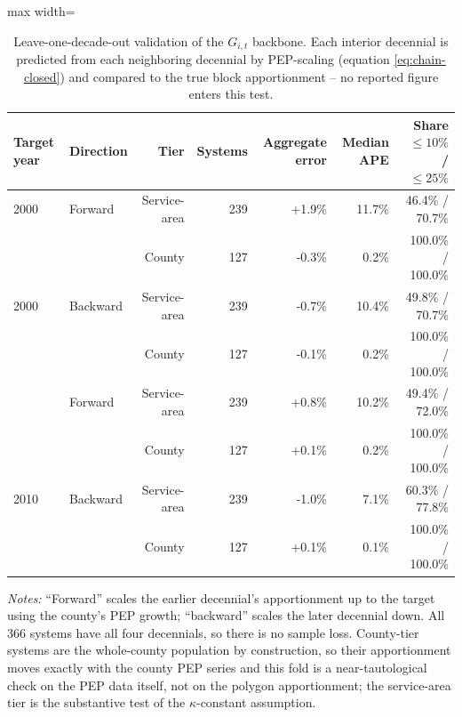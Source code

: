 \begin{table}[ht]
\centering
\caption{Leave-one-decade-out validation of the $G_{i,t}$ backbone. Each interior decennial is predicted from each neighboring decennial by PEP-scaling (equation \ref{eq:chain-closed}) and compared to the true block apportionment -- no reported figure enters this test.}
\label{tab:backcast_lodo}
\begin{adjustbox}{max width=\textwidth}
\begin{tabular}{llrrrrr}
\toprule
Target year & Direction & Tier & Systems & Aggregate error & Median APE & Share $\le\!10\%$ / $\le\!25\%$ \\
\midrule
2000 & Forward & Service-area & 239 & +1.9\% & 11.7\% & 46.4\% / 70.7\% \\
 &  & County & 127 & -0.3\% & 0.2\% & 100.0\% / 100.0\% \\
2000 & Backward & Service-area & 239 & -0.7\% & 10.4\% & 49.8\% / 70.7\% \\
 &  & County & 127 & -0.1\% & 0.2\% & 100.0\% / 100.0\% \\
\addlinespace
2010 & Forward & Service-area & 239 & +0.8\% & 10.2\% & 49.4\% / 72.0\% \\
 &  & County & 127 & +0.1\% & 0.2\% & 100.0\% / 100.0\% \\
2010 & Backward & Service-area & 239 & -1.0\% & 7.1\% & 60.3\% / 77.8\% \\
 &  & County & 127 & +0.1\% & 0.1\% & 100.0\% / 100.0\% \\
\bottomrule
\end{tabular}
\end{adjustbox}
\begin{minipage}{\textwidth}\footnotesize\raggedright
\vspace{0.5em}
\textit{Notes:} ``Forward'' scales the earlier decennial's apportionment up to the target using the county's PEP growth; ``backward'' scales the later decennial down. All 366 systems have all four decennials, so there is no sample loss. County-tier systems are the whole-county population by construction, so their apportionment moves exactly with the county PEP series and this fold is a near-tautological check on the PEP data itself, not on the polygon apportionment; the service-area tier is the substantive test of the $\kappa$-constant assumption.
\end{minipage}
\end{table}
